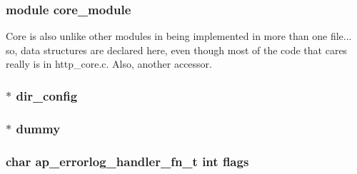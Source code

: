 \subsubsection[{\texorpdfstring{core\+\_\+module}{core_module}}]{ {\bf module} core\+\_\+module}\hypertarget{group__APACHE__CORE__HTTPD_gafebd5dacd393edc6b65481d68544c59a}{}\label{group__APACHE__CORE__HTTPD_gafebd5dacd393edc6b65481d68544c59a}
Core is also unlike other modules in being implemented in more than one file... so, data structures are declared here, even though most of the code that cares really is in http\+\_\+core.\+c. Also, another accessor. 
\subsubsection[{\texorpdfstring{dir\+\_\+config}{dir_config}}]{ $\ast$ dir\+\_\+config}\hypertarget{group__APACHE__CORE__HTTPD_ga26cd16f35c94a1f60fac284b846e00f2}{}\label{group__APACHE__CORE__HTTPD_ga26cd16f35c94a1f60fac284b846e00f2}
\subsubsection[{\texorpdfstring{dummy}{dummy}}]{$\ast$ dummy}\hypertarget{group__APACHE__CORE__HTTPD_ga99dc3b67257851cb91efea473083cd0f}{}\label{group__APACHE__CORE__HTTPD_ga99dc3b67257851cb91efea473083cd0f}
\subsubsection[{\texorpdfstring{flags}{flags}}]{\setlength{\rightskip}{0pt plus 5cm}char {\bf ap\+\_\+errorlog\+\_\+handler\+\_\+fn\+\_\+t} {\bf int} flags}\hypertarget{group__APACHE__CORE__HTTPD_ga51be03be0607209442ab11a6100c2afe}{}\label{group__APACHE__CORE__HTTPD_ga51be03be0607209442ab11a6100c2afe}
